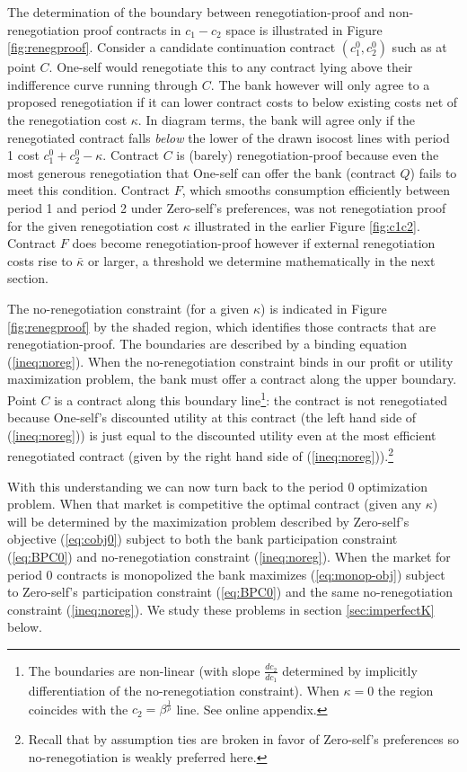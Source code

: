 \documentclass[11pt,english]{article}
\theoremstyle{plain}
\theoremstyle{definition}
\begin{document}
The determination of the boundary between renegotiation-proof and
non-renegotiation proof contracts in $c_{1}-c_{2}$ space is illustrated
in Figure \ref{fig:renegproof}. Consider a candidate continuation
contract $(c_{1}^{0},c_{2}^{0})$ such as at point $C$. One-self
would renegotiate this to any contract lying above their indifference
curve running through $C$. The bank however will only agree to a
proposed renegotiation if it can lower contract costs to below existing
costs net of the renegotiation cost $\kappa.$ In diagram terms, the
bank will agree only if the renegotiated contract falls \textit{below}
the lower of the drawn isocost lines with period 1 cost $c_{1}^{0}+c_{2}^{0}-\kappa$.
Contract $C$ is (barely) renegotiation-proof because even the most
generous renegotiation that One-self can offer the bank (contract
$Q$) fails to meet this condition. Contract $F$, which smooths consumption
efficiently between period 1 and period 2 under Zero-self's preferences,
was not renegotiation proof for the given renegotiation cost $\kappa$
illustrated in the earlier Figure \ref{fig:c1c2}. Contract $F$ does
become renegotiation-proof however if external renegotiation costs
rise to $\bar{\kappa}$ or larger, a threshold we determine mathematically
in the next section. 

The no-renegotiation constraint (for a given $\kappa$) is indicated
in Figure \ref{fig:renegproof} by the shaded region, which identifies
those contracts that are renegotiation-proof. The boundaries are described
by a binding equation (\ref{ineq:noreg}). When the no-renegotiation
constraint binds in our profit or utility maximization problem, the
bank must offer a contract along the upper boundary. Point $C$ is
a contract along this boundary line\footnote{The boundaries are non-linear (with slope $\frac{dc_{2}}{dc_{1}}$
determined by implicitly differentiation of the no-renegotiation constraint).
When $\kappa=0$ the region coincides with the $c_{2}=\beta^{\frac{1}{\rho}}$
line. See online appendix.}: the contract is not renegotiated because One-self's discounted utility
at this contract (the left hand side of (\ref{ineq:noreg})) is just
equal to the discounted utility even at the most efficient renegotiated
contract (given by the right hand side of (\ref{ineq:noreg})).\footnote{Recall that by assumption ties are broken in favor of Zero-self's
preferences so no-renegotiation is weakly preferred here. }

With this understanding we can now turn back to the period 0 optimization
problem. When that market is competitive the optimal contract (given
any $\kappa$) will be determined by the maximization problem described
by Zero-self's objective (\ref{eq:cobj0}) subject to both the bank
participation constraint (\ref{eq:BPC0}) and no-renegotiation constraint
(\ref{ineq:noreg}). When the market for period 0 contracts is monopolized
the bank maximizes (\ref{eq:monop-obj}) subject to Zero-self's participation
constraint (\ref{eq:BPC0}) and the same no-renegotiation constraint
(\ref{ineq:noreg}). We study these problems in section \ref{sec:imperfectK}
below.
\end{document}

